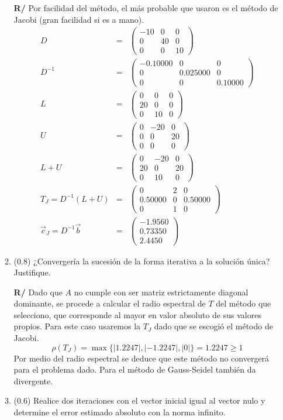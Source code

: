 \documentclass[12pt]{article}
\begin{document}
\begin{enumerate}[leftmargin=*,widest=9]
\begin{enumerate}[label=\alph*]
\textbf{R/} Por facilidad del método, el más probable que usaron es el método de Jacobi (gran facilidad si es a mano).
    \begin{eqnarray*}
    D &=& \begin{pmatrix}
    -10 & 0 & 0\\ 0 & 40 & 0\\ 0 & 0 & 10
    \end{pmatrix} \\
    D^{-1} &=& \begin{pmatrix}
    -0.10000 & 0 & 0\\ 0 & 0.025000 & 0\\ 0 & 0 & 0.10000
    \end{pmatrix} \\
    L & = & \begin{pmatrix}
    0 & 0 & 0\\ 20 & 0 & 0\\ 0 & 10 & 0
    \end{pmatrix} \\
    U & = & \begin{pmatrix}
    0 & -20 & 0\\ 0 & 0 & 20\\ 0 & 0 & 0
    \end{pmatrix} \\
    L + U & = & \begin{pmatrix}
    0 & -20 & 0\\ 20 & 0 & 20\\ 0 & 10 & 0
    \end{pmatrix} \\
    T_J = D^{-1}(L+U) & = & \begin{pmatrix}
    0 & 2 & 0\\ 0.50000 & 0 & 0.50000\\ 0 & 1 & 0
    \end{pmatrix} \\
    \vec{c}_J= D^{-1}\vec{b} & = & \begin{pmatrix}
    -1.9560 \\ 0.73350 \\ 2.4450
    \end{pmatrix}
    \end{eqnarray*}
    \item (\(0.8\)) ¿Convergería la sucesión de la forma iterativa a la solución única? Justifique.

\textbf{R/} Dado que \(A\) no cumple con ser matriz estrictamente diagonal dominante, se procede a calcular el radio espectral de \(T\) del método que selecciono, que corresponde al mayor en valor absoluto de sus valores propios. Para este caso usaremos la \(T_J\) dado que se escogió el método de Jacobi.
    \[
    \rho(T_J) = \max\lbrace |1.2247|, |-1.2247|, |0| \rbrace = 1.2247 \geq 1
    \]
    Por medio del radio espectral se deduce que este método no convergerá para el problema dado.
    Para el método de Gauss-Seidel también da divergente.
    \item (\(0.6\)) Realice dos iteraciones con el vector inicial igual al vector nulo y determine el error estimado absoluto con la norma infinito.


\end{enumerate}
\end{enumerate}
\end{document}
